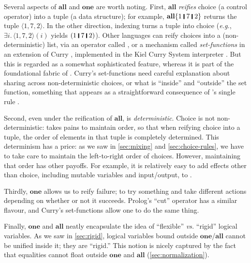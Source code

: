 \documentclass[acmsmall,review,anonymous,dvipsnames]{acmart}
\newcommand{\Varid}[1]{\mathit{#1}}
\newcommand{\eg}{\emph{e.g.}}
\newcommand{\vs}{\emph{vs.}}
\begin{document}
Several aspects of \ensuremath{\textbf{all}} and \ensuremath{\textbf{one}} are worth noting.
First, \ensuremath{\textbf{all}} \emph{reifies} choice (a control operator) into a tuple (a data structure);
for example, \ensuremath{\textbf{all}\{\mathrm{1}\;\rule[-0.3mm]{0.5mm}{2.5mm}\;\mathrm{7}\;\rule[-0.3mm]{0.5mm}{2.5mm}\;\mathrm{2}\}} returns the tuple \ensuremath{\langle{}\mathrm{1},\mathrm{7},\mathrm{2}\rangle}.
In the other direction, indexing turns a tuple into choice ({\eg}, \ensuremath{\exists\Varid{i}.\,\langle{}\mathrm{1},\mathrm{7},\mathrm{2}\rangle(\Varid{i})} yields \ensuremath{(\mathrm{1}\;\rule[-0.3mm]{0.5mm}{2.5mm}\;\mathrm{7}\;\rule[-0.3mm]{0.5mm}{2.5mm}\;\mathrm{2})}).
Other languages can reify choices into a (non-deterministic)
list, via an operator called , or a mechanism called
\emph{set-functions} in an extension of Curry \cite[Section 4.2.7]{curry:tutorial},
implemented in the Kiel Curry System interpreter \cite{brassel:encapsulated,kics,hanus:set-functions}.
But this is regarded as a somewhat sophisticated feature,
whereas it is part of the foundational fabric of \versecalc{}.
Curry's set-functions need careful explanation about sharing across non-deterministic choices,
or what is ``inside'' and ``outside'' the set function, something that appears as a straightforward
consequence of \versecalc{}'s single rule .

Second, even under the reification of \ensuremath{\textbf{all}},
\versecalc{} is \emph{deterministic}.  Choice is not
non-deterministic: \versecalc{} takes pains to maintain order, so that
when reifying choice into a tuple, the order of elements in that
tuple is completely determined.
This determinism has a price: as we saw in \cref{sec:mixing}
and \cref{sec:choice-rules}, we have to take care to maintain the
left-to-right order of choices.
However, maintaining that order has other payoffs. For example, it is relatively easy to add
effects other than choice, including mutable variables and input/output, to \versecalc{}.

Thirdly, \ensuremath{\textbf{one}} allows us to reify failure; to try something and take different actions
depending on whether or not it succeeds. Prolog's ``cut'' operator has a similar flavour,
and Curry's set-functions allow one to do the same thing.

Finally, \ensuremath{\textbf{one}} and \ensuremath{\textbf{all}} neatly encapsulate the idea of ``flexible'' {\vs} ``rigid'' logical variables.
As we saw in \cref{sec:rigid}, logical variables bound outside \ensuremath{\textbf{one}}/\ensuremath{\textbf{all}} cannot be unified inside it;
they are ``rigid.''  This notion is nicely captured by the fact that equalities
cannot float outside \ensuremath{\textbf{one}} and \ensuremath{\textbf{all}} (\cref{sec:normalization}).
\end{document}
